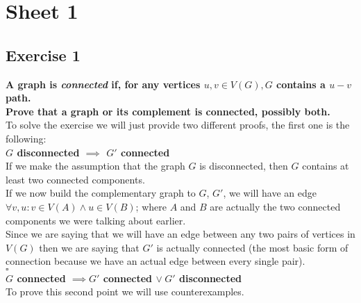 \section*{Sheet 1}
\subsection*{Exercise 1}
\boldmath
\textbf{A graph is \textit{connected} if, for any vertices $u, v \in V(G), G$ contains a $u - v$ path.\\
Prove that a graph or its complement is connected, possibly both.}\vspace{10pt}\\
\unboldmath
To solve the exercise we will just provide two different proofs, the first one is the following:\vspace{5pt}\\
\boldmath
\textbf{$G$ disconnected $\implies$ $G'$ connected}\vspace{5pt}\\
\unboldmath
If we make the assumption that the graph $G$ is disconnected, then $G$ contains at least two connected components.\\
If we now build the complementary graph to $G$, $G'$, we will have an edge $\forall v, u : v \in V(A) \land u \in V(B)$; where $A$ and $B$ are actually the two connected components we were talking about earlier.\\
Since we are saying that we will have an edge between any two pairs of vertices in $V(G)$ then we are saying that $G'$ is actually connected (the most basic form of connection because we have an actual edge between every single pair).
\vspace{2pt}\\\hspace*{3cm}$\square$\vspace*{10pt}\\
\boldmath
\textbf{$G$ connected $\implies G'$ connected $\vee\hspace{3pt} G'$ disconnected}\vspace{5pt}\\
\unboldmath
To prove this second point we will use counterexamples. \\
